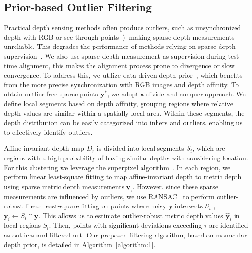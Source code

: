 % 
% 
\subsection{Prior-based Outlier Filtering}
\label{sec:noise_filter}
Practical depth sensing methods often produce outliers, such as unsynchronized depth with RGB or see-through points~\cite{conti22confidence}), making sparse depth measurements unreliable.
This degrades the performance of methods relying on sparse depth supervision~\cite{wong2021unsupervised,wong2020void}.
We also use sparse depth measurement as supervision during test-time alignment, this makes the alignment process prone to divergence or slow convergence.
To address this,
we utilize data-driven depth prior~\cite{ke2023repurposing, gui2024depthfm}, which benefits from the more precise synchronization with RGB images and depth affinity.
To obtain outlier-free sparse points $\mathbf{y}^*$, we adopt a divide-and-conquer approach.
We define local segments based on depth affinity, grouping regions where relative depth values are similar within a spatially local area.
Within these segments, the depth distribution can be easily categorized into inliers and outliers, enabling us to effectively identify outliers.

Affine-invariant depth map $D_r$ is divided into local segments $S_i$, which are regions with a high probability of having similar depths with considering location. 
For this clustering 
we leverage the superpixel algorithm~\cite{achanta2012slic, li2015lsc}.
In each region, we perform linear least-square fitting to map affine-invariant depth to metric depth using sparse metric depth measurements $\mathbf{y}_i$.
However, since these sparse measurements are influenced by outliers, we use RANSAC~\cite{fischler1981ransac} to perform outlier-robust linear least-square fitting on points where noisy $\mathbf{y}$ intersects $S_i$ \ie, $\mathbf{y}_i \leftarrow S_i \cap \mathbf{y}$.
This allows us to estimate outlier-robust metric depth values $\hat{\mathbf{y}}_i$ in local regions $S_i$.
Then, points with significant deviations exceeding $\tau$ are identified as outliers and filtered out.
Our proposed filtering algorithm, based on monocular depth prior, is detailed in Algorithm~\ref{algorithm:1}.



